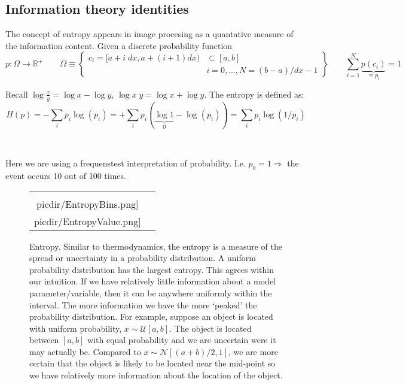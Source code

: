 \documentclass{article}         %
\theoremstyle{definition}
\theoremstyle{remark}
\newcommand{\picdir}{pdffig/}
\begin{document}
\subsection{Information theory identities}

The concept of entropy appears
in image procesing as a quantative measure of the information content.
Given a discrete probability function 
\[
p: \Omega \rightarrow \mathbb{R}^+
\qquad
  \Omega \equiv
\left\{
\begin{split}
c_i
= 
[a+i \; dx , a + (i+1) dx ) & \subset [a,b]
\\
& i = 0,..., N =   (b-a)/dx -1
\end{split}
\right\}
\qquad
 \sum_{i=1}^N  \underbrace{p(c_i)}_{ \equiv p_i} = 1
\]
\begin{minipage}{.7\textwidth}
Recall $\log \frac{x}{y} = \log x - \log y$,
       $\log x\; y       = \log x + \log y$.
The entropy is defined as:
\[
H(p)=-\sum_i p_i \log(p_i)
    =+\sum_i p_i ( \underbrace{\log 1}_{0} -  \log(p_i) ) 
    = \sum_i p_i \log\left(1/p_i\right)
\]
\end{minipage}~\begin{minipage}{.29\textwidth}
\end{minipage}

Here we are using a frequenstest interpretation of probability.
I.e. $p_0 = 1 \Rightarrow$  the event occurs 10 out of 100 times.

\begin{figure}[h]
\centering
\begin{tabular}{cc}
\scalebox{0.41}{\texttt{[image: \\picdir/EntropyBins.png]}} 
&
\scalebox{0.41}{\texttt{[image: \\picdir/EntropyValue.png]}} 
\end{tabular}
\caption{Entropy.
Similar to thermodynamics, the entropy
is a measure of the spread or uncertainty in a probability
distribution. A uniform probability distribution has the largest entropy.
This agrees within our intuition. If we have relatively little information
about a model parameter/variable, then it can be anywhere uniformly within
the interval. The more information we have the more `peaked' the probability
distribution. For example, suppose  an object is located with uniform
probability, $x \sim \mathcal{U}[a,b]$. The object is located 
between $[a,b]$ with equal probability and we are uncertain were it may
actually be. Compared to $x \sim \mathcal{N}[(a+b)/2,1]$, we are more
certain that the object is likely to be located near the mid-point
so we have relatively more information about the location of the object.
}
\end{figure}
\end{document}

